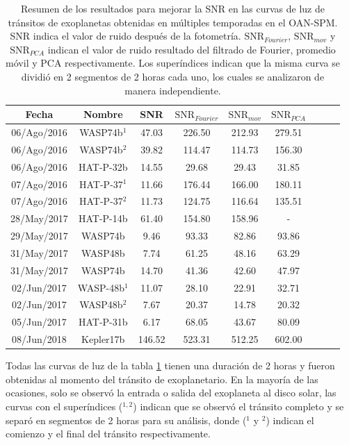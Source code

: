 \begin{table}
	\centering
	\begin{footnotesize}
	\begin{tabular}{ccccccccc}
	\hline 
	Fecha & Nombre & SNR & $\mbox{SNR}_{Fourier}$ &  $\mbox{SNR}_{mov}$ & $\mbox{SNR}_{PCA}$\\ 
	\hline
	06/Ago/2016 & WASP74b$^{1}$ & 47.03 & 226.50 & 212.93 & 279.51 \\ 
	06/Ago/2016 & WASP74b$^{2}$ & 39.82 & 114.47 & 114.73 & 156.30 \\
	06/Ago/2016 & HAT-P-32b & 14.55 & 29.68 & 29.43 & 31.85 \\
	07/Ago/2016 & HAT-P-37$^{1}$ & 11.66 & 176.44 & 166.00 & 180.11 \\ 
	07/Ago/2016 & HAT-P-37$^{2}$ & 11.73 & 124.75 & 116.64 & 135.51 \\ 
	28/May/2017 & HAT-P-14b & 61.40 & 154.80 & 158.96 & - \\ 
	29/May/2017 & WASP74b & 9.46 & 93.33 & 82.86 & 93.86 \\
	31/May/2017 & WASP48b & 7.74 & 61.25 & 48.16 & 63.29 \\  
	31/May/2017 & WASP74b & 14.70 & 41.36 & 42.60 & 47.97 \\
	02/Jun/2017 & WASP-48b$^{1}$ & 11.07 & 28.10 & 22.91 & 32.71 \\
	02/Jun/2017 & WASP48b$^{2}$ & 7.67 & 20.37 & 14.78 & 20.32 \\
	05/Jun/2017 & HAT-P-31b & 6.17 & 68.05 & 43.67 & 80.09 \\
	08/Jun/2018 & Kepler17b & 146.52 & 523.31 & 512.25 & 602.00 \\ 
	\hline 
	\end{tabular} 
	\end{footnotesize}
	\caption{Resumen de los resultados para mejorar la SNR en las curvas de luz de tránsitos de exoplanetas obtenidas en múltiples temporadas en el OAN-SPM. SNR indica el valor de ruido después de la fotometría. $\mbox{SNR}_{Fourier}$, $\mbox{SNR}_{mov}$ y $\mbox{SNR}_{PCA}$ indican el valor de ruido resultado del filtrado de Fourier, promedio móvil y PCA respectivamente. Los superíndices indican que la misma curva se dividió en 2 segmentos de 2 horas cada uno, los cuales se analizaron de manera independiente.}
	\label{tab_resultados_obs}
	\end{table}

Todas las curvas de luz de la tabla \ref{tab_resultados_obs} tienen una duración de 2 horas y fueron obtenidas al momento del tránsito de exoplanetario. En la mayoría de las ocasiones, solo se observó la entrada o salida del exoplaneta al disco solar, las curvas con el superíndices ($^{1,2}$) indican que se observó el tránsito completo y se separó en segmentos de 2 horas para su análisis, donde ($^{1}$ y $^{2}$) indican el comienzo y el final del tránsito respectivamente.


